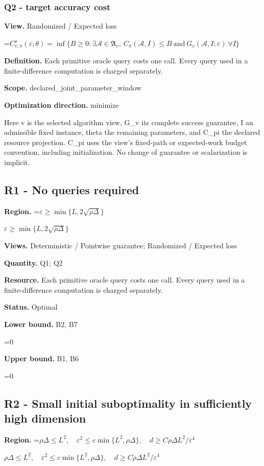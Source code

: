 \documentclass[10pt,a4paper]{article}
\newcommand{\AtlasMath}[1]{\par\begingroup\centering\setbox0=\hbox{$\displaystyle #1$}\ifdim\wd0>1.4\linewidth\typeout{ATLAS WIDE FORMULA: \the\wd0}\fi\ifdim\wd0>\linewidth\resizebox{\linewidth}{!}{\box0}\else\box0\fi\par\endgroup}
\newcommand{\AtlasInlineMath}[1]{\begingroup\setbox0=\hbox{$#1$}\ifdim\wd0>.4\linewidth\endgroup\AtlasMath{#1}\else\endgroup$#1$\fi}
\begin{document}
\subsubsection{Q2 - target accuracy cost}
\textbf{View.} Randomized / Expected loss

\AtlasMath{C^\star_{v,\pi}(\varepsilon;\theta)=\inf\{B\ge0:\exists\mathcal A\in\mathfrak A_v,\ C_\pi(\mathcal A,I)\le B\ \text{and}\ G_v(\mathcal A,I;\varepsilon)\ \forall I\}}
\textbf{Definition.} Each primitive oracle query costs one call. Every query used in a finite-difference computation is charged separately.

\textbf{Scope.} declared\_joint\_parameter\_window

\textbf{Optimization direction.} minimize

Here v is the selected algorithm view, G\_v its complete success guarantee, I an admissible fixed instance, theta the remaining parameters, and C\_pi the declared resource projection. C\_pi uses the view's fixed-path or expected-work budget convention, including initialization. No change of guarantee or scalarization is implicit.

\subsection{R1 - No queries required}
\textbf{Region.} \AtlasInlineMath{\varepsilon\ge\min\{L,2\sqrt{\rho\Delta}\}}

\textbf{Views.} Deterministic / Pointwise guarantee; Randomized / Expected loss

\textbf{Quantity.} Q1; Q2

\textbf{Resource.} Each primitive oracle query costs one call. Every query used in a finite-difference computation is charged separately.

\textbf{Status.} Optimal

\textbf{Lower bound.} B2, B7

\AtlasMath{0}
\textbf{Upper bound.} B1, B6

\AtlasMath{0}
\subsection{R2 - Small initial suboptimality in sufficiently high dimension}
\textbf{Region.} \AtlasInlineMath{\rho\Delta\le L^2,\quad\varepsilon^2\le c\min\{L^2,\rho\Delta\},\quad d\ge C\rho\Delta L^2/\varepsilon^4}
\end{document}
